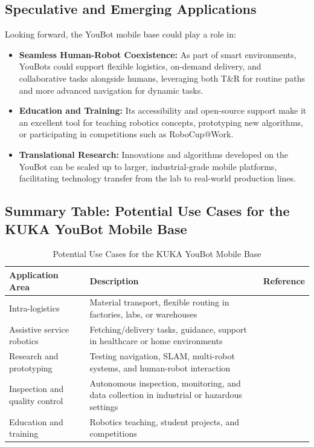 \documentclass[a4paper, 12pt]{article}
\begin{document}
    \subsection{Speculative and Emerging Applications}

    Looking forward, the YouBot mobile base could play a role in:

    \begin{itemize}
        \item \textbf{Seamless Human-Robot Coexistence:} As part of smart environments, YouBots could support flexible logistics, on-demand delivery, and collaborative tasks alongside humans, leveraging both T\&R for routine paths and more advanced navigation for dynamic tasks.
        \item \textbf{Education and Training:} Its accessibility and open-source support make it an excellent tool for teaching robotics concepts, prototyping new algorithms, or participating in competitions such as RoboCup@Work.
        \item \textbf{Translational Research:} Innovations and algorithms developed on the YouBot can be scaled up to larger, industrial-grade mobile platforms, facilitating technology transfer from the lab to real-world production lines.
    \end{itemize}

    \subsection{Summary Table: Potential Use Cases for the KUKA YouBot Mobile Base}

    \begin{table}[h!]
    \centering
    \begin{tabular}{|l|p{7cm}|l|}
    \hline
    \textbf{Application Area} & \textbf{Description} & \textbf{Reference} \\
    \hline
    Intra-logistics & Material transport, flexible routing in factories, labs, or warehouses &  \\
    Assistive service robotics & Fetching/delivery tasks, guidance, support in healthcare or home environments &  \\
    Research and prototyping & Testing navigation, SLAM, multi-robot systems, and human-robot interaction & \\
    Inspection and quality control & Autonomous inspection, monitoring, and data collection in industrial or hazardous settings &  \\
    Education and training & Robotics teaching, student projects, and competitions &  \\
    \hline
    \end{tabular}
    \caption{Potential Use Cases for the KUKA YouBot Mobile Base}
    \end{table}
\end{document}
